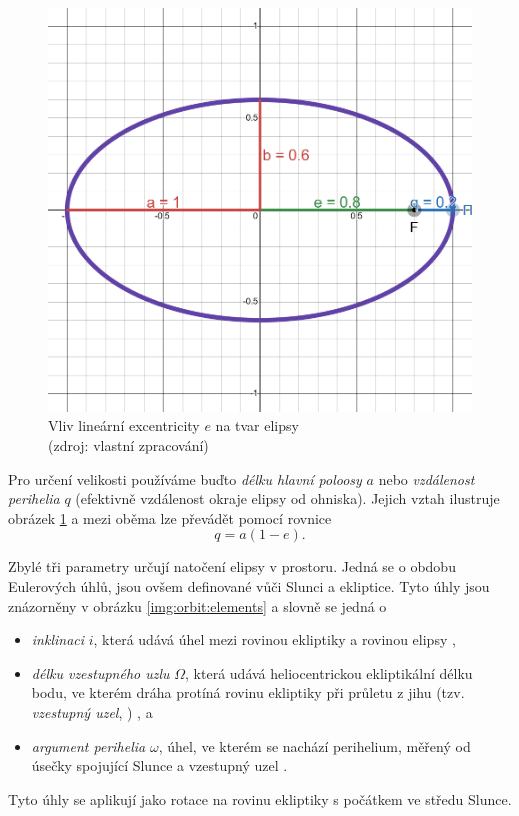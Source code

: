 \begin{figure}[ht]
    \includegraphics[width=0.5\linewidth]{img/ellipse-e08.png}
    \caption[Vliv lineární excentricity $e$ na tvar elipsy]{Vliv lineární excentricity $e$ na tvar elipsy\\{\small (zdroj: vlastní zpracování)}}
    \label{img:orbit:ellipse}
\end{figure}

Pro určení velikosti používáme buďto \textit{délku hlavní poloosy} $a$ nebo \textit{vzdálenost perihelia} $q$ (efektivně vzdálenost okraje elipsy od ohniska). Jejich vztah ilustruje obrázek \ref{img:orbit:ellipse} a mezi oběma lze převádět pomocí rovnice \cite{ceplecha}
$$
    q=a(1-e)\text{.}
$$

\smallskip

Zbylé tři parametry určují natočení elipsy v prostoru. Jedná se o obdobu Eulerových úhlů, jsou ovšem definované vůči Slunci a ekliptice. Tyto úhly jsou znázorněny v obrázku \ref{img:orbit:elements} a slovně se jedná o
\begin{itemize}
    \item \textit{inklinaci} $i$, která udává úhel mezi rovinou ekliptiky a rovinou elipsy \cite{astro},
    \item \textit{délku vzestupného uzlu} $\Omega$, která udává heliocentrickou ekliptikální délku bodu, ve kterém dráha protíná rovinu ekliptiky při průletu z jihu (tzv. \textit{vzestupný uzel}, \NorthNode) \cite{astro}, a
    \item \textit{argument perihelia} $\omega$, úhel, ve kterém se nachází perihelium, měřený od úsečky spojující Slunce a vzestupný uzel \cite{astro}.
\end{itemize}
Tyto úhly se aplikují jako rotace na rovinu ekliptiky s počátkem ve středu Slunce.


